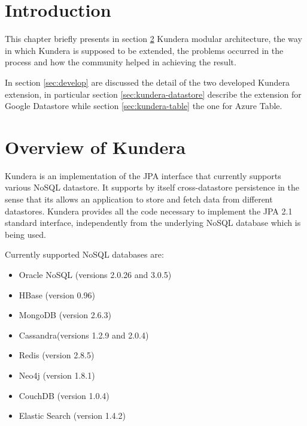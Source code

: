 \section{Introduction}
This chapter briefly presents in section \ref{sec:kundera} Kundera modular architecture, the way in which Kundera is supposed to be extended, the problems occurred in the process and how the community helped in achieving the result.

\noindent In section \ref{sec:develop} are discussed the detail of the two developed Kundera extension, in particular section \ref{sec:kundera-datastore} describe the extension for Google Datastore while section \ref{sec:kundera-table} the one for Azure Table.

\section{Overview of Kundera}
\label{sec:kundera}
Kundera \cite{online:kundera} is an implementation of the JPA interface that currently supports various NoSQL datastore. It supports by itself cross-datastore persistence in the sense that its allows an application to store and fetch data from different datastores.
Kundera provides all the code necessary to implement the JPA 2.1 standard interface, independently from the underlying NoSQL database which is being used.

\newparagraph Currently supported NoSQL databases are:
\begin{itemize}
\item Oracle NoSQL (versions 2.0.26 and 3.0.5)
\item HBase (version 0.96)
\item MongoDB (version 2.6.3)
\item Cassandra(versions 1.2.9 and 2.0.4)
\item Redis (version 2.8.5)
\item Neo4j (version 1.8.1)
\item CouchDB (version 1.0.4)
\item Elastic Search (version 1.4.2)
\end{itemize}

